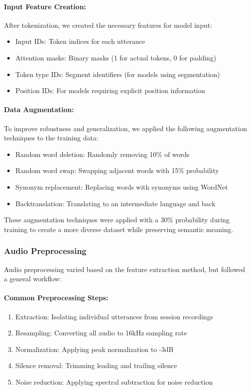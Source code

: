 \documentclass[12pt]{article}
\begin{document}
\paragraph{Input Feature Creation:}
After tokenization, we created the necessary features for model input:
\begin{itemize}
    \item Input IDs: Token indices for each utterance
    \item Attention masks: Binary masks (1 for actual tokens, 0 for padding)
    \item Token type IDs: Segment identifiers (for models using segmentation)
    \item Position IDs: For models requiring explicit position information
\end{itemize}

\paragraph{Data Augmentation:}
To improve robustness and generalization, we applied the following augmentation techniques to the training data:
\begin{itemize}
    \item Random word deletion: Randomly removing 10\% of words
    \item Random word swap: Swapping adjacent words with 15\% probability
    \item Synonym replacement: Replacing words with synonyms using WordNet
    \item Backtranslation: Translating to an intermediate language and back
\end{itemize}

These augmentation techniques were applied with a 30\% probability during training to create a more diverse dataset while preserving semantic meaning.

\subsubsection{Audio Preprocessing}
Audio preprocessing varied based on the feature extraction method, but followed a general workflow:

\paragraph{Common Preprocessing Steps:}
\begin{enumerate}
    \item Extraction: Isolating individual utterances from session recordings
    \item Resampling: Converting all audio to 16kHz sampling rate
    \item Normalization: Applying peak normalization to -3dB
    \item Silence removal: Trimming leading and trailing silence
    \item Noise reduction: Applying spectral subtraction for noise reduction
\end{enumerate}
\end{document}
